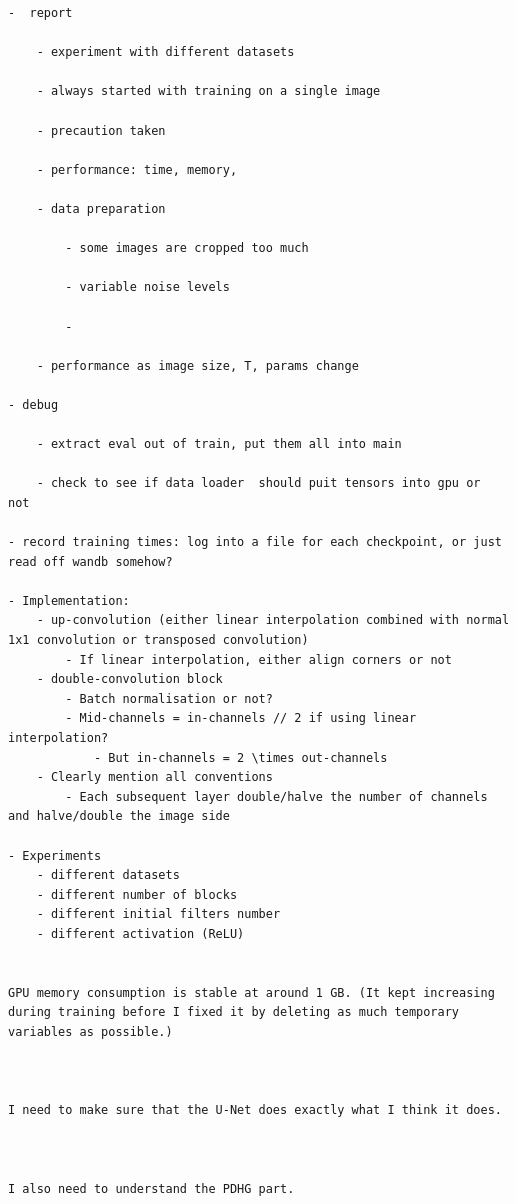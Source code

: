 \documentclass[12pt]{article}
\begin{document}
\begin{verbatim}
-  report
    
    - experiment with different datasets
    
    - always started with training on a single image
    
    - precaution taken
    
    - performance: time, memory, 
    
    - data preparation
        
        - some images are cropped too much
        
        - variable noise levels
        
        - 
  
    - performance as image size, T, params change

- debug

    - extract eval out of train, put them all into main

    - check to see if data loader  should puit tensors into gpu or  not

- record training times: log into a file for each checkpoint, or just read off wandb somehow? 

- Implementation:
    - up-convolution (either linear interpolation combined with normal 1x1 convolution or transposed convolution)
        - If linear interpolation, either align corners or not
    - double-convolution block
        - Batch normalisation or not?
        - Mid-channels = in-channels // 2 if using linear interpolation?
            - But in-channels = 2 \times out-channels
    - Clearly mention all conventions
        - Each subsequent layer double/halve the number of channels and halve/double the image side

- Experiments
    - different datasets
    - different number of blocks
    - different initial filters number
    - different activation (ReLU)


GPU memory consumption is stable at around 1 GB. (It kept increasing during training before I fixed it by deleting as much temporary variables as possible.)



I need to make sure that the U-Net does exactly what I think it does.



I also need to understand the PDHG part.




\end{verbatim}
\end{document}
